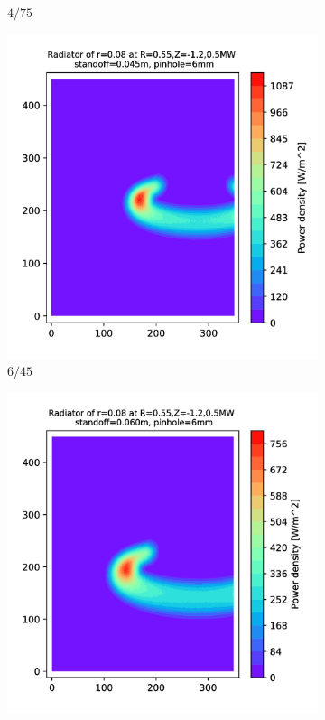 \begin{figure}
\begin{subfigure}{0.325\textwidth}
         \caption{$4/75$}
         \label{fig:$4_75$}
     \end{subfigure}
     \begin{subfigure}{0.3\textwidth}
         \centering
         \includegraphics[trim={70 0 110 0},clip,width=\textwidth]{Chapters/chapter2/figs/6_45.png}
         \caption{$6/45$}
         \label{fig:6_45}
     \end{subfigure}
     \hfill
     \begin{subfigure}{0.3\textwidth}
         \centering
         \includegraphics[trim={70 0 125 0},clip,width=\textwidth]{Chapters/chapter2/figs/6_60.png}

\end{subfigure}
\end{figure}
